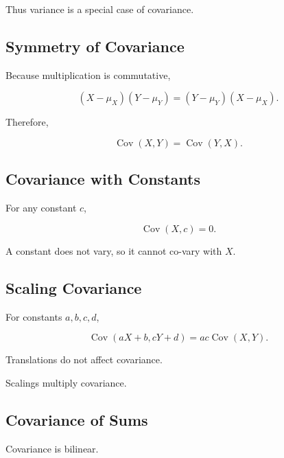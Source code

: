 Thus variance is a special case of covariance.

\subsection{Symmetry of Covariance}
\label{subsec:covariance-symmetry}

Because multiplication is commutative,

\[
(X-\mu_X)(Y-\mu_Y)
=
(Y-\mu_Y)(X-\mu_X).
\]

Therefore,

\[
\boxed{
\operatorname{Cov}(X,Y)
=
\operatorname{Cov}(Y,X).
}
\]

\subsection{Covariance with Constants}
\label{subsec:covariance-constants}

For any constant \(c\),

\[
\boxed{
\operatorname{Cov}(X,c)=0.
}
\]

A constant does not vary, so it cannot co-vary with \(X\).

\subsection{Scaling Covariance}
\label{subsec:scaling-covariance}

For constants \(a,b,c,d\),

\[
\boxed{
\operatorname{Cov}(aX+b,cY+d)
=
ac\operatorname{Cov}(X,Y).
}
\]

Translations do not affect covariance.

Scalings multiply covariance.

\subsection{Covariance of Sums}
\label{subsec:covariance-sums}

Covariance is bilinear.

